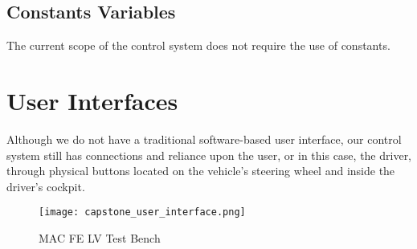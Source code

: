 \documentclass[12pt, titlepage]{article}
\begin{document}
\newpage
\subsection{Constants Variables}

The current scope of the control system does not require the use of constants.

\section{User Interfaces}

Although we do not have a traditional software-based user interface, our control system still has connections and reliance upon the user, or in this case, the driver, through physical buttons located on the vehicle's steering wheel and inside the driver's cockpit.




\begin{figure}[h!]
    \texttt{[image: capstone\_user\_interface.png]}
    \centering
    \caption{MAC FE LV Test Bench}
\end{figure}
\end{document}
